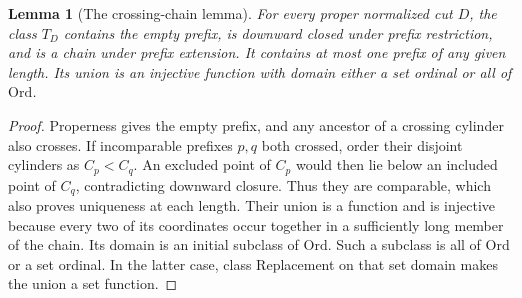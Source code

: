 \documentclass[11pt]{article}
\newtheorem{lemma}[lemma]{Lemma}
\theoremstyle{definition}
\theoremstyle{remark}
\newcommand{\Ord}{\mathrm{Ord}}
\begin{document}
\begin{lemma}[The crossing-chain lemma]\label{swo:tc:lem:crosschain}
For every proper normalized cut $D$, the class $T_D$ contains the empty
prefix, is downward closed under prefix restriction, and is a chain
under prefix extension. It contains at most one prefix of any given
length. Its union is an injective function with domain either a set
ordinal or all of $\Ord$.
\end{lemma}
\begin{proof}
Properness gives the empty prefix, and any ancestor of a crossing
cylinder also crosses. If incomparable prefixes $p,q$ both crossed,
order their disjoint cylinders as $C_p<C_q$. An excluded point of $C_p$
would then lie below an included point of $C_q$, contradicting downward
closure. Thus they are comparable, which also proves uniqueness at each
length. Their union is a function and is injective because every two
of its coordinates occur together in a sufficiently long member of the
chain. Its domain is an initial subclass of $\Ord$. Such a subclass is
all of $\Ord$ or a set ordinal. In the latter case, class Replacement
on that set domain makes the union a set function.
\end{proof}
\end{document}
